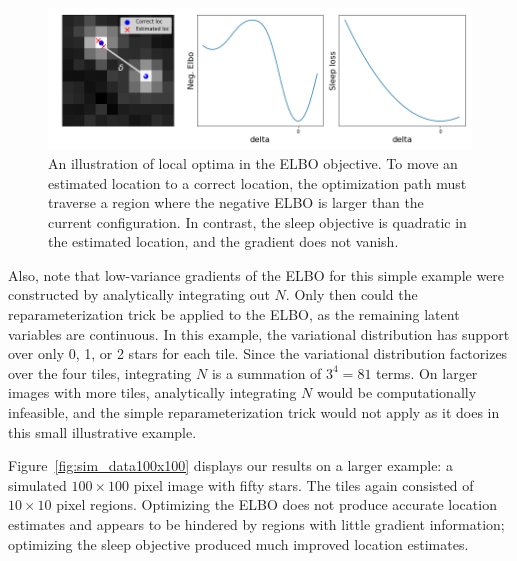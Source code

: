\begin{figure}[!htb]
    \centering
    \includegraphics[width=\textwidth]{figures/elbo_vs_sleep/local_minima_cartoon.png}
    \caption{An illustration of local optima in the ELBO objective. 
    To move an estimated location to a correct location, 
    the optimization path must traverse a region where the negative ELBO is larger than the current configuration. 
    In contrast, the sleep objective is quadratic in the estimated location, and the gradient does not vanish. }
    \label{fig:local_optima_cartoon}
\end{figure}

Also, note that low-variance gradients of the ELBO for this simple example were constructed by analytically integrating out $N$. Only then could the reparameterization trick be applied to the ELBO, as the remaining latent variables are continuous. 
In this example, the variational distribution has support over only 0, 1, or 2 stars for each tile. 
Since the variational distribution factorizes over the four tiles, integrating $N$ is a summation of $3^4 = 81$ terms.
On larger images with more tiles, analytically integrating $N$ would be computationally infeasible, 
and the simple reparameterization trick would not apply as it does in this small illustrative example. 

Figure~\ref{fig:sim_data100x100} displays our results on a larger example: a simulated $100\times 100$ pixel image with fifty stars. 
The tiles again consisted of $10\times 10$ pixel regions. 
Optimizing the ELBO does not produce accurate location estimates and appears to be hindered by regions with little gradient information; optimizing the sleep objective produced much improved location estimates.


